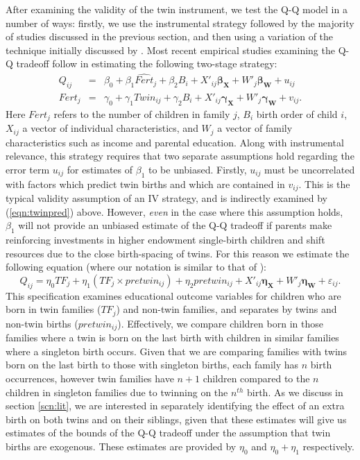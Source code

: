 \documentclass{article}[11pt,subeqn]
\newcommand{\vect}[1]{\mathbf{#1}}
\begin{document}
\begin{spacing}{1.5}
After examining the validity of the twin instrument, we test the Q-Q model in a number of ways: firstly,  we use the instrumental strategy followed by the majority of 
studies discussed in the previous section, and then using a variation of the technique initially discussed by \citet{RosenzweigZhang2009}. Most recent empirical studies 
examining the Q-Q tradeoff follow \cite{Angristetal2010} in estimating the following two-stage strategy:
\begin{subequations}
\label{eqn:2SLS}
\begin{eqnarray}
\label{eqn:QQ}
Q_{ij}&=&\beta_0+\beta_1\widehat{Fert}_j+\beta_2B_{i}+X'_{ij}\vect{\beta_{\vect{X}}}+W'_j\vect{\beta_\vect{W}}+u_{ij} \label{eqn:2SLSa}\\
Fert_{j}&=&\gamma_0+\gamma_1Twin_{ij}+\gamma_2B_{i}+X'_{ij}\vect{\gamma_\vect{X}}+W'_j\vect{\gamma_\vect{W}}+v_{ij}. \label{eqn:2SLSb}
 \end{eqnarray}
\end{subequations}
Here $Fert_j$ refers to the number of children in family $j$, $B_i$ birth order of child $i$, $X_{ij}$ a vector of individual characteristics, and $W_j$ 
a vector of family characteristics such as income and parental education.  Along with instrumental relevance, this strategy requires that two separate 
assumptions hold regarding the error term $u_{ij}$ for estimates of $\beta_1$ to be unbiased.  Firstly, $u_{ij}$ must be uncorrelated with factors which
predict twin births and which are contained in $v_{ij}$.  This is the typical validity assumption of an IV strategy, and is indirectly examined by 
(\ref{eqn:twinpred}) above.  However, \emph{even} in the case where this assumption holds, $\beta_1$ will not provide an unbiased estimate of the Q-Q
tradeoff if parents make reinforcing investments in higher endowment single-birth children and shift resources due to the close birth-spacing of twins.
For this reason we estimate the following equation (where our notation is similar to that of \citet{RosenzweigZhang2009}):
\begin{equation}
 \label{eqn:RZ}
 Q_{ij}=\eta_0TF_j+\eta_1(TF_j\times pretwin_{ij})+\eta_2pretwin_{ij}+X'_{ij}\vect{\eta_\vect{X}}+W'_j\vect{\eta_\vect{W}}+\varepsilon_{ij}.
\end{equation}
This specification examines educational outcome variables for children who are born in twin families ($TF_j$) and non-twin families, and separates by
twins and non-twin births ($pretwin_{ij}$).  Effectively, we compare children born in those families where a twin is born on the last birth with children
in similar families where a singleton birth occurs.  Given that we are comparing families with twins born on the last birth to those with singleton births,
each family has $n$ birth occurrences, however twin families have $n+1$ children compared to the $n$ children in singleton families due to twinning on the 
$n^{th}$ birth.  As we discuss in section 
\ref{scn:lit}, we are interested in separately identifying the effect of an extra birth on both twins and on their siblings, given that these estimates
will give us estimates of the bounds of the Q-Q tradeoff under the assumption that twin births are exogenous.  These estimates are provided by $\eta_0$
and $\eta_0+\eta_1$ respectively.


\end{spacing}
\end{document}
